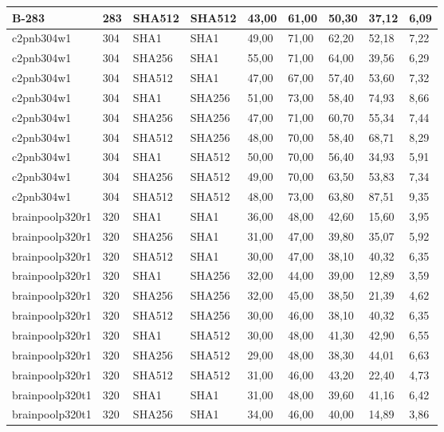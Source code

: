 \begin{longtable}{| l | l | l | l | l |l |l |l |l |}
B-283 & 283 & SHA512 & SHA512 & 43,00 & 61,00 & 50,30 & 37,12 & 6,09 \\ \hline 
c2pnb304w1 & 304 & SHA1 & SHA1 & 49,00 & 71,00 & 62,20 & 52,18 & 7,22 \\ \hline 
c2pnb304w1 & 304 & SHA256 & SHA1 & 55,00 & 71,00 & 64,00 & 39,56 & 6,29 \\ \hline 
c2pnb304w1 & 304 & SHA512 & SHA1 & 47,00 & 67,00 & 57,40 & 53,60 & 7,32 \\ \hline 
c2pnb304w1 & 304 & SHA1 & SHA256 & 51,00 & 73,00 & 58,40 & 74,93 & 8,66 \\ \hline 
c2pnb304w1 & 304 & SHA256 & SHA256 & 47,00 & 71,00 & 60,70 & 55,34 & 7,44 \\ \hline 
c2pnb304w1 & 304 & SHA512 & SHA256 & 48,00 & 70,00 & 58,40 & 68,71 & 8,29 \\ \hline 
c2pnb304w1 & 304 & SHA1 & SHA512 & 50,00 & 70,00 & 56,40 & 34,93 & 5,91 \\ \hline 
c2pnb304w1 & 304 & SHA256 & SHA512 & 49,00 & 70,00 & 63,50 & 53,83 & 7,34 \\ \hline 
c2pnb304w1 & 304 & SHA512 & SHA512 & 48,00 & 73,00 & 63,80 & 87,51 & 9,35 \\ \hline 
brainpoolp320r1 & 320 & SHA1 & SHA1 & 36,00 & 48,00 & 42,60 & 15,60 & 3,95 \\ \hline 
brainpoolp320r1 & 320 & SHA256 & SHA1 & 31,00 & 47,00 & 39,80 & 35,07 & 5,92 \\ \hline 
brainpoolp320r1 & 320 & SHA512 & SHA1 & 30,00 & 47,00 & 38,10 & 40,32 & 6,35 \\ \hline 
brainpoolp320r1 & 320 & SHA1 & SHA256 & 32,00 & 44,00 & 39,00 & 12,89 & 3,59 \\ \hline 
brainpoolp320r1 & 320 & SHA256 & SHA256 & 32,00 & 45,00 & 38,50 & 21,39 & 4,62 \\ \hline 
brainpoolp320r1 & 320 & SHA512 & SHA256 & 30,00 & 46,00 & 38,10 & 40,32 & 6,35 \\ \hline 
brainpoolp320r1 & 320 & SHA1 & SHA512 & 30,00 & 48,00 & 41,30 & 42,90 & 6,55 \\ \hline 
brainpoolp320r1 & 320 & SHA256 & SHA512 & 29,00 & 48,00 & 38,30 & 44,01 & 6,63 \\ \hline 
brainpoolp320r1 & 320 & SHA512 & SHA512 & 31,00 & 46,00 & 43,20 & 22,40 & 4,73 \\ \hline 
brainpoolp320t1 & 320 & SHA1 & SHA1 & 31,00 & 48,00 & 39,60 & 41,16 & 6,42 \\ \hline 
brainpoolp320t1 & 320 & SHA256 & SHA1 & 34,00 & 46,00 & 40,00 & 14,89 & 3,86 \\ \hline 

\end{longtable}
